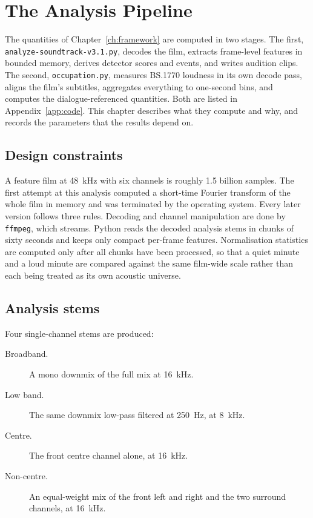 \chapter{The Analysis Pipeline}
\label{ch:pipeline}

The quantities of Chapter~\ref{ch:framework} are computed in two stages. The first, \texttt{analyze-soundtrack-v3.1.py}, decodes the film, extracts frame-level features in bounded memory, derives detector scores and events, and writes audition clips. The second, \texttt{occupation.py}, measures BS.1770 loudness in its own decode pass, aligns the film's subtitles, aggregates everything to one-second bins, and computes the dialogue-referenced quantities. Both are listed in Appendix~\ref{app:code}. This chapter describes what they compute and why, and records the parameters that the results depend on.

\section{Design constraints}

A feature film at 48~kHz with six channels is roughly 1.5 billion samples. The first attempt at this analysis computed a short-time Fourier transform of the whole film in memory and was terminated by the operating system. Every later version follows three rules. Decoding and channel manipulation are done by \texttt{ffmpeg}, which streams. Python reads the decoded analysis stems in chunks of sixty seconds and keeps only compact per-frame features. Normalisation statistics are computed only after all chunks have been processed, so that a quiet minute and a loud minute are compared against the same film-wide scale rather than each being treated as its own acoustic universe.

\section{Analysis stems}

Four single-channel stems are produced:

\begin{description}
\item[Broadband.] A mono downmix of the full mix at 16~kHz.
\item[Low band.] The same downmix low-pass filtered at 250~Hz, at 8~kHz.
\item[Centre.] The front centre channel alone, at 16~kHz.
\item[Non-centre.] An equal-weight mix of the front left and right and the two surround channels, at 16~kHz.
\end{description}

